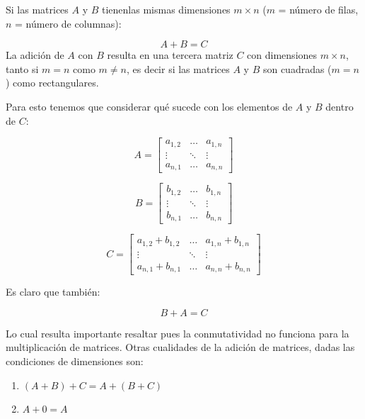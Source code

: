 \documentclass[
]{book}
\providecommand{\tightlist}{%
  \setlength{\itemsep}{0pt}\setlength{\parskip}{0pt}}
\begin{document}
Si las matrices \(A\) y \(B\) tienenlas mismas dimensiones \(m \times n\) (\(m\) = número de filas, \(n\) = número de columnas):

\[A + B = C\]
La adición de \(A\) con \(B\) resulta en una tercera matriz \(C\) con dimensiones \(m \times n\), tanto si \(m = n\) como \(m \neq n\), es decir si las matrices \(A\) y \(B\) son cuadradas (\(m = n\)) como rectangulares.

Para esto tenemos que considerar qué sucede con los elementos de \(A\) y \(B\) dentro de \(C\):

\begin{equation}
A = \left[ 
\begin{array}{ccc}
a_{1, 2} & \dots & a_{1, n} \\
\vdots   & \ddots & \vdots \\
a_{n, 1} & \dots & a_{n, n}
\end{array} \right]
\end{equation}

\begin{equation}
B = \left[ 
\begin{array}{ccc}
b_{1, 2} & \dots & b_{1, n} \\
\vdots   & \ddots& \vdots \\
b_{n, 1} & \dots & b_{n, n}
\end{array} \right]
\end{equation}

\begin{equation}
C = \left[ 
\begin{array}{ccc}
a_{1, 2} + b_{1, 2} & \dots & a_{1, n} + b_{1, n} \\
\vdots   & \ddots & \vdots \\
a_{n, 1} + b_{n, 1} & \dots & a_{n, n} + b_{n, n}
\end{array} \right]
\end{equation}

Es claro que también:

\[B+A = C\]

Lo cual resulta importante resaltar pues la conmutatividad no funciona para la multiplicación de matrices. Otras cualidades de la adición de matrices, dadas las condiciones de dimensiones son:

\begin{enumerate}
\def\labelenumi{\arabic{enumi}.}
\tightlist
\item
  \((A+B)+C=A+(B+C)\)
\item
  \(A + 0 = A\)
\end{enumerate}
\end{document}
